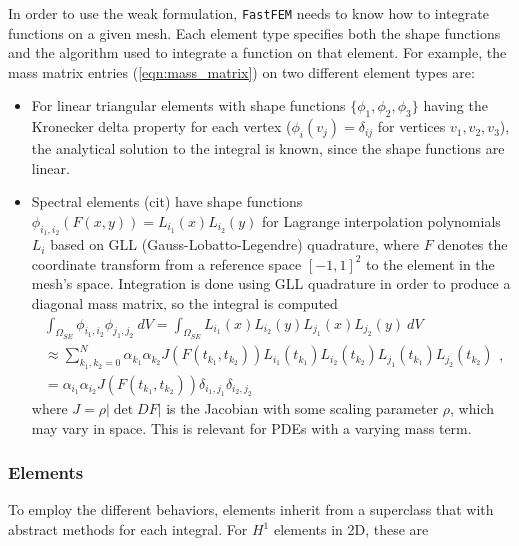 In order to use the weak formulation, \texttt{FastFEM} needs to know how to integrate functions on a given mesh. Each element type specifies both the shape functions and the algorithm used to integrate a function on that element. For example, the mass matrix entries (\ref{eqn:mass_matrix}) on two different element types are:

\begin{itemize}
\item For linear triangular elements with shape functions $\{\phi_1,\phi_2,\phi_3\}$ having the Kronecker delta property for each vertex ($\phi_i(v_j) = \delta_{ij}$ for vertices $v_1,v_2,v_3$), the analytical solution to the integral is known, since the shape functions are linear.

\item Spectral elements (cit) have shape functions $\phi_{i_1,i_2}(F(x,y)) = L_{i_1}(x)L_{i_2}(y)$ for Lagrange interpolation polynomials $L_i$ based on GLL (Gauss-Lobatto-Legendre) quadrature, where $F$ denotes the coordinate transform from a reference space $[-1,1]^2$ to the element in the mesh's space. Integration is done using GLL quadrature in order to produce a diagonal mass matrix, so the integral is computed
\begin{equation}
\begin{aligned}
    \int_{\Omega_{SE}} \phi_{i_1,i_2}\phi_{j_1,j_2} ~dV = \int_{\Omega_{SE}} L_{i_1}(x)L_{i_2}(y)L_{j_1}(x)L_{j_2}(y) ~dV \\
    \approx \sum_{k_1,k_2=0}^N \alpha_{k_1}\alpha_{k_2} J(F(t_{k_1},t_{k_2}))L_{i_1}(t_{k_1})L_{i_2}(t_{k_2})L_{j_1}(t_{k_1})L_{j_2}(t_{k_2}) \\
    = \alpha_{i_1}\alpha_{i_2}J(F(t_{k_1},t_{k_2}))\delta_{i_1,j_1}\delta_{i_2,j_2}
\end{aligned},
\label{eqn:spectral_mass_matrix}
\end{equation}
where $J = \rho|\det DF|$ is the Jacobian with some scaling parameter $\rho$, which may vary in space. This is relevant for PDEs with a varying mass term.
\end{itemize}


\subsubsection{Elements} \label{sec:elem_field:elements}
To employ the different behaviors, elements inherit from a superclass that with abstract methods for each integral. For $H^1$ elements in 2D, these are


